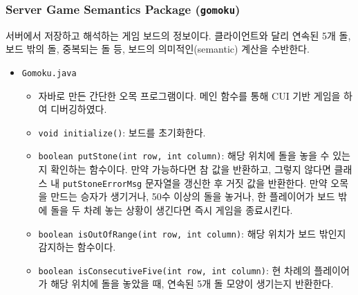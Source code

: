 \documentclass[a4paper, 10pt]{article}
\begin{document}
\subsubsection{Server Game Semantics Package (\texttt{gomoku})}
서버에서 저장하고 해석하는 게임 보드의 정보이다. 클라이언트와 달리 연속된 5개 돌,
보드 밖의 돌, 중복되는 돌 등, 보드의 의미적인(semantic) 계산을 수반한다.
\begin{itemize}
  \item \texttt{Gomoku.java}
  \begin{itemize}
    \item[] 자바로 만든 간단한 오목 프로그램이다. 메인 함수를 통해 CUI 기반 게임을 하여 디버깅하였다.
    \item \texttt{void initialize()}: 보드를 초기화한다.
    \item \texttt{boolean putStone(int row, int column)}: 해당 위치에 돌을 놓을 수 있는지 확인하는 함수이다.
    만약 가능하다면 참 값을 반환하고, 그렇지 않다면 클래스 내 \texttt{putStoneErrorMsg} 문자열을 갱신한 후
    거짓 값을 반환한다. 만약 오목을 만드는 승자가 생기거나, 50수 이상의 돌을 놓거나,
    한 플레이어가 보드 밖에 돌을 두 차례 놓는 상황이 생긴다면 즉시 게임을 종료시킨다.
    \item \texttt{boolean isOutOfRange(int row, int column)}: 해당 위치가 보드 밖인지 감지하는 함수이다.
    \item \texttt{boolean isConsecutiveFive(int row, int column)}: 현 차례의 플레이어가 해당 위치에 돌을
    놓았을 때, 연속된 5개 돌 모양이 생기는지 반환한다.
  \end{itemize}
\end{itemize}
\end{document}
